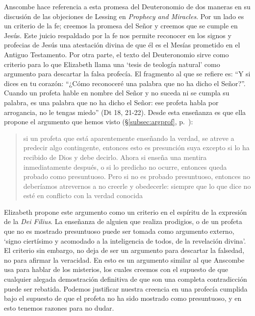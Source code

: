 Anscombe hace referencia a esta promesa del Deuteronomio de dos maneras en su discusión de las objeciones de Lessing en \emph{Prophecy and Miracles}. Por un lado es un criterio de la fe; creemos la promesa del Señor y creemos que se cumple en Jesús. Este juicio respaldado por la fe nos permite reconocer en los signos y profecias de Jesús una atestación divina de que él es el Mesías prometido en el Antiguo Testamento. Por otra parte, el texto del Deuteronomio sirve como criterio para lo que Elizabeth llama una `tesis de teología natural' como argumento para descartar la falsa profecía. El fragmento al que se refiere es: \enquote{Y si dices en tu corazón: ``¿Cómo reconoceré una palabra que no ha dicho el Señor?''. Cuando un profeta hable en nombre del Señor y no suceda ni se cumpla su palabra, es una palabra que no ha dicho el Señor: ese profeta habla por arrogancia, no le tengas miedo} (Dt 18, 21-22). Desde esta enseñanza es que ella propone el argumento que hemos visto (\S\ref{subsec:argprof}, p.~\pageref{subsec:argprof}): \blockquote[]{si un profeta que está aparentemente enseñando la verdad, se atreve a predecir algo contingente, entonces esto es presunción suya excepto si lo ha recibido de Dios y debe decirlo. Ahora si enseña una mentira inmediatamente después, o si lo predicho no ocurre, entonces queda probado como presuntuoso. Pero si no es probado presuntuoso, entonces no deberíamos atrevernos a no creerle y obedecerle: siempre que lo que dice no esté en conflicto con la verdad conocida}. Elizabeth propone este argumento como un criterio en el espíritu de la expresión de la \emph{Dei Filius}. La enseñanza de alguien que realiza prodigios, o de un profeta que no es mostrado presuntuoso puede ser tomada como argumento externo, \enquote*{signo ciertísimo y acomodado a la inteligencia de todos, de la revelación divina}. El criterio sin embargo, no deja de ser un argumento para descartar la falsedad, no para afirmar la veracidad. En esto es un argumento similar al que Anscombe usa para hablar de los misterios, los cuales creemos con el supuesto de que cualquier alegada demostración definitiva de que son una completa contradicción puede ser rebatida. Podemos justificar nuestra creencia en una profecía cumplida bajo el supuesto de que el profeta no ha sido mostrado como presuntuoso, y en esto tenemos razones para no dudar.

